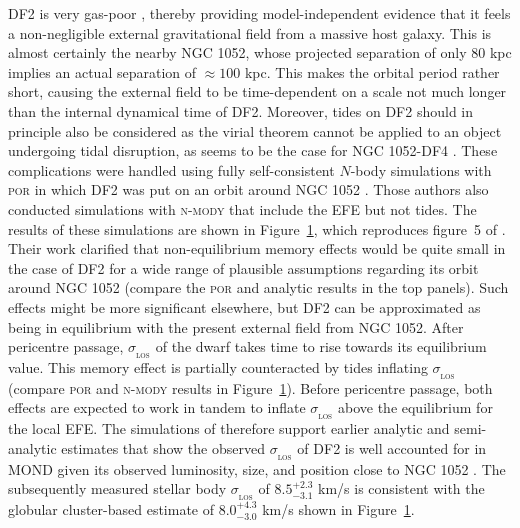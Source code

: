 \documentclass[fleqn,usenatbib,useAMS]{mnras} %
\begin{document}
\begin{figure}
	\label{Haghi_2019_DF2_Figure_5}
\end{figure}

DF2 is very gas-poor \citep{Chowdhury_2019, Sardone_2019}, thereby providing model-independent evidence that it feels a non-negligible external gravitational field from a massive host galaxy. This is almost certainly the nearby NGC 1052, whose projected separation of only 80 kpc implies an actual separation of $\approx 100$ kpc. This makes the orbital period rather short, causing the external field to be time-dependent on a scale not much longer than the internal dynamical time of DF2. Moreover, tides on DF2 should in principle also be considered as the virial theorem cannot be applied to an object undergoing tidal disruption, as seems to be the case for NGC 1052-DF4 \citep{Montes_2020, Keim_2022}. These complications were handled using fully self-consistent $N$-body simulations with \textsc{por} \citep{Lughausen_2015} in which DF2 was put on an orbit around NGC 1052 \citep{Haghi_2019_DF2}. Those authors also conducted simulations with \textsc{n-mody} \citep{Ciotti_2006} that include the EFE but not tides. The results of these simulations are shown in Figure~\ref{Haghi_2019_DF2_Figure_5}, which reproduces figure~5 of \citet{Haghi_2019_DF2}. Their work clarified that non-equilibrium memory effects would be quite small in the case of DF2 for a wide range of plausible assumptions regarding its orbit around NGC 1052 (compare the \textsc{por} and analytic results in the top panels). Such effects might be more significant elsewhere, but DF2 can be approximated as being in equilibrium with the present external field from NGC 1052. After pericentre passage, $\sigma_{_\text{LOS}}$ of the dwarf takes time to rise towards its equilibrium value. This memory effect \citep{Haghi_2009, Wu_2013} is partially counteracted by tides inflating $\sigma_{_\text{LOS}}$ (compare \textsc{por} and \textsc{n-mody} results in Figure~\ref{Haghi_2019_DF2_Figure_5}). Before pericentre passage, both effects are expected to work in tandem to inflate $\sigma_{_\text{LOS}}$ above the equilibrium for the local EFE. The simulations of \citet{Haghi_2019_DF2} therefore support earlier analytic and semi-analytic estimates that show the observed $\sigma_{_\text{LOS}}$ of DF2 is well accounted for in MOND given its observed luminosity, size, and position close to NGC 1052 \citep{Famaey_2018, Kroupa_2018_DF2}. The subsequently measured stellar body $\sigma_{_\text{LOS}}$ of $8.5^{+2.3}_{-3.1}$ km/s \citep{Danieli_2019} is consistent with the globular cluster-based estimate of $8.0^{+4.3}_{-3.0}$ km/s shown in Figure~\ref{Haghi_2019_DF2_Figure_5}.
\end{document}
